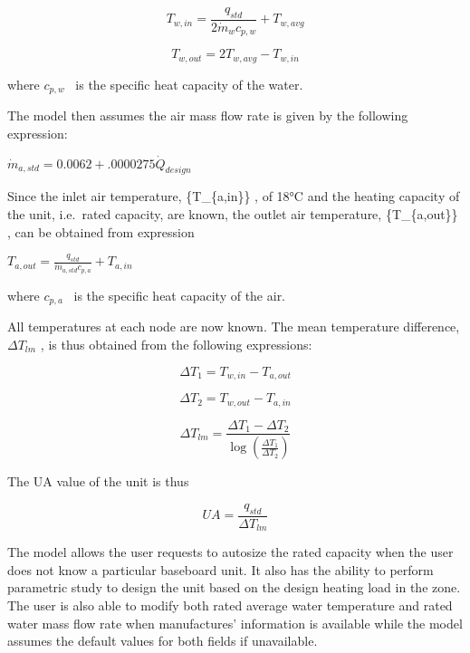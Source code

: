 \begin{equation}
{T_{w,in}} = \frac{{{q_{std}}}}{{2\dot m{}_w{c_{p,w}}}} + {T_{w,avg}}
\end{equation}

\begin{equation}
{T_{w,out}} = 2{T_{w,avg}} - {T_{w,in}}
\end{equation}

where \({c_{p,w}}\) ~is the specific heat capacity of the water.

The model then assumes the air mass flow rate is given by the following expression:

$\dot{m}_{a,std} = 0.0062 + .0000275 \dot{Q}_{design}$

Since the inlet air temperature, \{T\_\{a,in\}\} , of 18°C and the heating capacity of the unit, i.e.~rated capacity, are known, the outlet air temperature, \{T\_\{a,out\}\} , can be obtained from expression

$T_{a,out} = \frac{q_{std}}{\dot{m}_{a,std}c_{p,a}} + T_{a,in}$

where \({c_{p,a}}\) ~is the specific heat capacity of the air.

All temperatures at each node are now known. The mean temperature difference, \(\Delta {T_{lm}}\) , is thus obtained from the following expressions:

\begin{equation}
\Delta {T_1} = {T_{w,in}} - {T_{a,out}}
\end{equation}

\begin{equation}
\Delta {T_2} = {T_{w,out}} - {T_{a,in}}
\end{equation}

\begin{equation}
\Delta {T_{lm}} = \frac{{\Delta {T_1} - \Delta {T_2}}}{{\log \left( {\frac{{\Delta {T_1}}}{{\Delta {T_2}}}} \right)}}
\end{equation}

The UA value of the unit is thus

\begin{equation}
UA = \frac{{{q_{std}}}}{{\Delta {T_{lm}}}}
\end{equation}

The model allows the user requests to autosize the rated capacity when the user does not know a particular baseboard unit. It also has the ability to perform parametric study to design the unit based on the design heating load in the zone. The user is also able to modify both rated average water temperature and rated water mass flow rate when manufactures' information is available while the model assumes the default values for both fields if unavailable.

